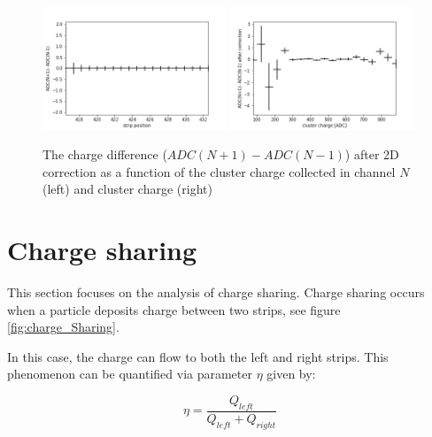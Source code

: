 \begin{figure}
\begin{center}
\includegraphics[width = 0.49\textwidth]{figures/eta/difference_ac.png} 
\includegraphics[width = 0.49\textwidth]{figures/eta/difference_vs_charge_ac.png}
\caption{The charge difference ($ADC(N+1) - ADC(N-1)$) after 2D correction as a function of the cluster charge collected in channel $N$ (left) and cluster charge (right) }
\label{fig:after_correction}
 \end{center}
 \end{figure}



\section{Charge sharing}
This section focuses on the analysis of charge sharing. Charge sharing occurs when a particle deposits charge between two strips, see figure \ref{fig:charge_Sharing}. 


In this case, the charge can flow to both the left and right strips.  
This phenomenon can be quantified via parameter $\eta$ given by:

\begin{equation}
    \eta = \frac{Q_{left}}{Q_{left}+Q_{right}}
\end{equation}


